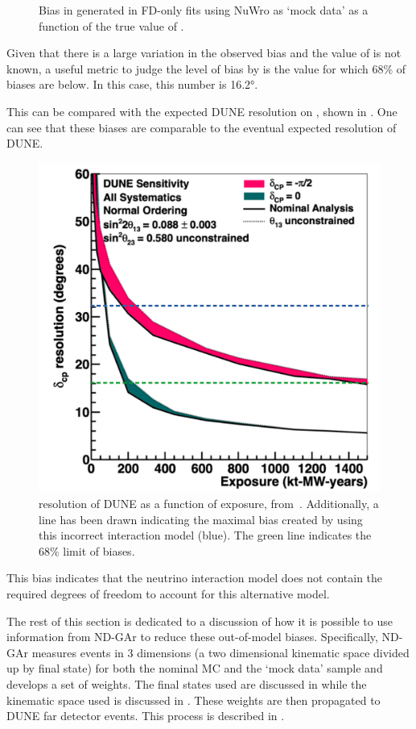 \begin{figure}[h]
	\begin{adjustbox}{max totalsize=.6\linewidth, center}
		
	\end{adjustbox}
	\caption[Example of \dcp bias in FD-only fits using NuWro data]{Bias in \dcp generated in FD-only fits using NuWro as `mock data' as a function of the true value of \dcp.}
	\label{fig:dcpBiasNoWgt}
\end{figure}

Given that there is a large variation in the observed bias and the value of \dcp is not known, a useful metric to judge the level of bias by is the value for which 68\% of biases are below.
In this case, this number is \ang{16.2}.

This can be compared with the expected DUNE resolution on \dcp, shown in . 
One can see that these biases are comparable to the eventual expected \dcp resolution of DUNE.
\begin{figure}[h]
	\centering
	\includegraphics[width=.5\linewidth]{files/figures/dune_ndrwt/dcpResWithLines-cropped}
	\caption[\dcp resolution of DUNE as a function of exposure]{\dcp resolution of DUNE as a function of exposure, from~\cite{Abi:2020qib}. Additionally, a line has been drawn indicating the maximal \dcp bias created by using this incorrect interaction model (blue). The green line indicates the 68\% limit of \dcp biases.}
	\label{fig:dcpResDUNE}
\end{figure}

This bias indicates that the neutrino interaction model does not contain the required degrees of freedom to account for this alternative model.


The rest of this section is dedicated to a discussion of how it is possible to use information from ND-GAr to reduce these out-of-model biases.
Specifically, ND-GAr measures events in 3 dimensions (a two dimensional kinematic space divided up by final state) for both the nominal MC and the `mock data' sample and develops a set of weights.
The final states used are discussed in  while the kinematic space used is discussed in .
These weights are then propagated to DUNE far detector events. 
This process is described in .

